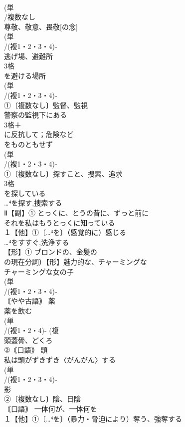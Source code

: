 \documentclass[8pt]{extreport}
\begin{document}
\begin{CJK}{UTF8}{min}
\\	(単
\\	/複数なし 
\\	尊敬、敬意、畏敬[の念] 
\\	(単
\\	/(複1・2・3・4)‐
\\	逃げ場、避難所 
\\	3格　
\\	を避ける場所
\\	(単
\\	/(複1・2・3・4)‐
\\	①〔複数なし〕監督、監視 
\\	警察の監視下にある
\\	3格＋
\\	に反抗して；危険など
\\	をものともせず
\\	(単
\\	/(複1・2・3・4)‐
\\	①〔複数なし〕探すこと、捜索、追求 
\\	3格 
\\	を探している 
\\	…⁴を探す,捜索する 
\\	Ⅱ【副】① とっくに、とうの昔に、ずっと前に 
\\	それを私はもうとっくに知っている
\\	１【他】①〔…⁴を〕（感覚的に）感じる 
\\	…⁴をすすぐ,洗浄する
\\	【形】① ブロンドの、金髪の 
\\	の現在分詞）【形】魅力的な、チャーミングな 
\\	チャーミングな女の子
\\	(単
\\	/(複1・2・3・4)‐
\\	｟やや古語｠ 薬 
\\	薬を飲む 
\\	(単
\\	/(複1・2・4)- (複
\\	頭蓋骨、どくろ 
\\	②｟口語｠ 頭 
\\	私は頭がずきずき〈がんがん〉する
\\	(単
\\	/(複1・2・3・4)‐ 
\\	影 
\\	②〔複数なし〕陰、日陰 
\\	｟口語｠ 一体何が、一体何を
\\	１【他】①〔…⁴を〕（暴力・脅迫により）奪う、強奪する 

\end{CJK}
\end{document}
